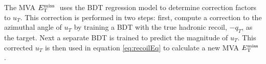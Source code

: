 The MVA $E_\mathrm{T}^{\mathrm{miss}}\;$ uses the BDT regression model 
to determine correction factors to $u_{T}$. This correction
is performed in two steps: %
first, compute a correction to the azimuthal angle
of $u_{T}$ by training a BDT with the true hadronic recoil, $-q_{T}$, as the target. Next
 a separate BDT is trained to predict the magnitude of $u_{T}$. This corrected
 $u_{T}$ is then used in equation \ref{eq:recoilEq} %
 to calculate a new MVA $E_\mathrm{T}^{\mathrm{miss}}\;$. %
